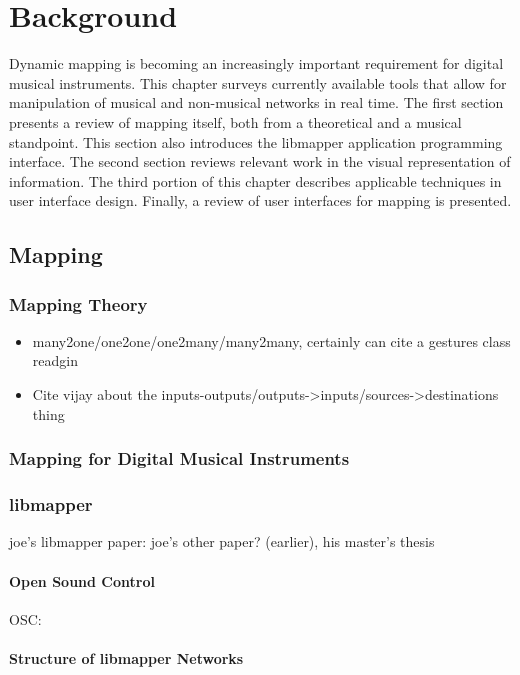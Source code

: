 \chapter{Background}

Dynamic mapping is becoming an increasingly important requirement for digital musical instruments. This chapter surveys currently available tools that allow for manipulation of musical and non-musical networks in real time. The first section presents a review of mapping itself, both from a theoretical and a musical standpoint. This section also introduces the libmapper application programming interface. The second section reviews relevant work in the visual representation of information. The third portion of this chapter describes applicable techniques in user interface design. Finally, a review of user interfaces for mapping is presented.

\section{Mapping}

	\subsection{Mapping Theory}

		\begin{itemize}
			\item many2one/one2one/one2many/many2many, certainly can cite a gestures class readgin %
			\item Cite vijay about the inputs-outputs/outputs->inputs/sources->destinations thing
		\end{itemize}


	\subsection{Mapping for Digital Musical Instruments}
	\subsection{libmapper}
		joe's libmapper paper: 
		joe's other paper? (earlier), his master's thesis
		\subsubsection{Open Sound Control}
		OSC: 
		\subsubsection{Structure of libmapper Networks}
